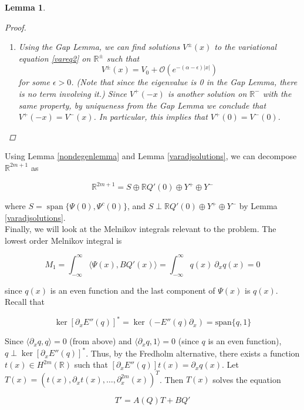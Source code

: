 \documentclass[12pt]{article}
\def\R{{\mathbb R}}
\DeclareMathOperator{\spn}{span}
\newtheorem{lemma}{Lemma}
\begin{document}
\begin{lemma}
\begin{proof}
\begin{enumerate}
\item Using the Gap Lemma, we can find solutions $V^\pm(x)$ to the variational equation \eqref{vareq2} on $\R^\pm$ such that
\[
V^\pm(x) = V_0 + \mathcal{O}(e^{-(\alpha - \epsilon)|x|})
\]
for some $\epsilon > 0$. (Note that since the eigenvalue is 0 in the Gap Lemma, there is no term involving it.) Since $V^+(-x)$ is another solution on $\R^-$ with the same property, by uniqueness from the Gap Lemma we conclude that $V^+(-x) = V^-(x)$. In particular, this implies that $V^+(0) = V^-(0)$.

\end{enumerate}
\end{proof}
\end{lemma}

Using Lemma \ref{nondegenlemma} and Lemma \ref{varadjsolutions}, we can decompose $\R^{2m+1}$ as  

\begin{equation}
\R^{2m+1} = S \oplus \R Q'(0) \oplus Y^+ \oplus Y^-
\end{equation}

where $S = \spn\{ \Psi(0), \Psi^c(0) \}$, and $S \perp \R Q'(0) \oplus Y^+ \oplus Y^-$ by Lemma \ref{varadjsolutions}.\\

Finally, we will look at the Melnikov integrals relevant to the problem. The lowest order Melnikov integral is

\begin{equation}\label{M1}
M_1 = \int_{-\infty}^\infty \langle \Psi(x), B Q'(x) \rangle =
\int_{-\infty}^\infty q(x) \: \partial_x q(x) = 0
\end{equation}

since $q(x)$ is an even function and the last component of $\Psi(x)$ is $q(x)$. Recall that 

\[
\ker [\partial_x E''(q)]^* = \ker(-E''(q) \partial_x) = 
\text{span}\{ q, 1 \}
\]

Since $\langle \partial_x q, q \rangle = 0$ (from above) and $\langle \partial_x q, 1 \rangle = 0$ (since $q$ is an even function), $q \perp \ker [\partial_x E''(q)]^*$. Thus, by the Fredholm alternative, there exists a function $t(x) \in H^{2m}(\R)$ such that $[ \partial_x E''(q) ]t(x) = \partial_x q(x)$. Let $T(x) = (t(x), \partial_x t(x), \dots, \partial_x^{2m}(x))^T$. Then $T(x)$ solves the equation

\begin{equation}\label{eqforT}
T' = A(Q)T + B Q'
\end{equation}
\end{document}
